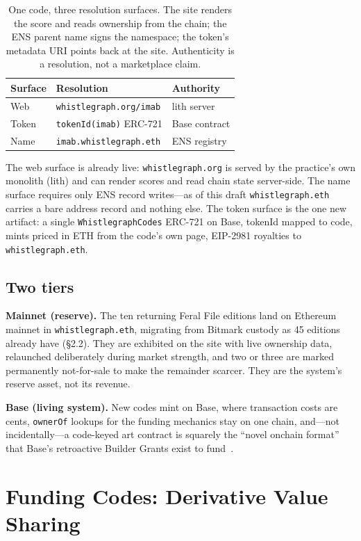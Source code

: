 \documentclass[10pt,letterpaper,twocolumn]{article}
\newcommand{\code}[1]{\texttt{#1}}
\begin{document}
\begin{table}[h]
\centering\small
\begin{tabular}{@{}lll@{}}
\toprule
\textbf{Surface} & \textbf{Resolution} & \textbf{Authority} \\
\midrule
Web & \code{whistlegraph.org/imab} & lith server \\
Token & \code{tokenId(imab)} ERC-721 & Base contract \\
Name & \code{imab.whistlegraph.eth} & ENS registry \\
\bottomrule
\end{tabular}
\caption{One code, three resolution surfaces. The site renders the score and reads ownership from the chain; the ENS parent name signs the namespace; the token's metadata URI points back at the site. Authenticity is a resolution, not a marketplace claim.}
\label{tab:triple}
\end{table}

The web surface is already live: \code{whistlegraph.org} is served by the practice's own monolith (lith) and can render scores and read chain state server-side. The name surface requires only ENS record writes---as of this draft \code{whistlegraph.eth} carries a bare address record and nothing else. The token surface is the one new artifact: a single \code{WhistlegraphCodes} ERC-721 on Base, tokenId mapped to code, mints priced in ETH from the code's own page, EIP-2981 royalties to \code{whistlegraph.eth}.

\subsection{Two tiers}

\textbf{Mainnet (reserve).} The ten returning Feral File editions land on Ethereum mainnet in \code{whistlegraph.eth}, migrating from Bitmark custody as 45 editions already have (\S2.2). They are exhibited on the site with live ownership data, relaunched deliberately during market strength, and two or three are marked permanently not-for-sale to make the remainder scarcer. They are the system's reserve asset, not its revenue.

\textbf{Base (living system).} New codes mint on Base, where transaction costs are cents, \code{ownerOf} lookups for the funding mechanics stay on one chain, and---not incidentally---a code-keyed art contract is squarely the ``novel onchain format'' that Base's retroactive Builder Grants exist to fund~\citep{base2026funded}.

\section{Funding Codes: Derivative Value Sharing}
\label{sec:funding}
\end{document}
